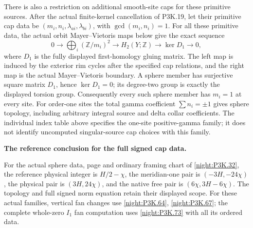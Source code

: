 \begin{theorem}
There is also a restriction on additional smooth-site caps for these
primitive sources.  After the actual finite-kernel cancellation of
P3K.19, let their primitive cap data be
\((m_i,n_i,\lambda_{ai},\lambda_{bi})\), with
\(\gcd(m_i,n_i)=1\).  For all these primitive data, the actual orbit Mayer--Vietoris
maps below give the exact sequence
\[
 0\longrightarrow\bigoplus_i(\mathbb Z/m_i)^2
 \longrightarrow H_2(Y;\mathbb Z)
 \longrightarrow\ker D_1\longrightarrow0,                \tag{P3K.22.1}
\]
where \(D_1\) is the fully displayed first-homology gluing matrix.
The left map is induced by the exterior rim cycles after the
specified cap relations, and the right map is the actual
Mayer--Vietoris boundary. A sphere member has surjective square
matrix \(D_1\), hence \(\ker D_1=0\); its degree-two group
is exactly the displayed torsion group. Consequently every such
sphere member has \(m_i=1\) at every site.  For order-one sites the total gamma
coefficient \(\sum n_i=\pm1\) gives sphere topology, including
arbitrary integral source and delta collar coefficients.  The
individual index table above specifies the one-site positive-gamma
family; it does not identify uncomputed singular-source cap choices
with this family.
\end{theorem}

\begin{proposition}\hypertarget{tag-01U9}{}\label{iv:correction:P3K.32}

\textbf{The reference conclusion for the full signed cap data.}\par
For the actual sphere data, page and ordinary framing
chart of \cref{night:P3K.32}, the reference physical integer is
\(H/2-\chi\), the meridian-one pair is \((-3H,-24\chi)\),
the physical pair is \((3H,24\chi)\), and the native free pair
is \((6\chi,3H-6\chi)\). The topology and full signed norm
equation retain their displayed scope. For these actual families,
vertical fan changes use \cref{night:P3K.64}, \cref{night:P3K.67};
the complete whole-zero \(I_1\) fan computation uses
\cref{night:P3K.73} with all its ordered data.
\end{proposition}

